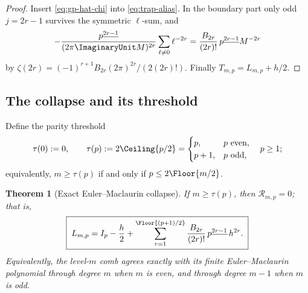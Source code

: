 \documentclass[11pt,oneside]{article}
\numberwithin{equation}{section}
\newtheorem{theorem}{Theorem}[section]
\theoremstyle{definition}
\theoremstyle{remark}
\newcommand{\fall}[2]{#1^{\underline{#2}}}
\newcommand{\defect}{\mathcal R}
\begin{document}
\begin{proof}
Insert \eqref{eq:gp-hat-chi} into \eqref{eq:trap-alias}.  In the
boundary part only odd $j=2r-1$ survives the symmetric $\ell$-sum, and
\[
 -\frac{\fall p{2r-1}}{(2\pi\ImaginaryUnit M)^{2r}}\sum_{\ell\ne0}\ell^{-2r}
 =\frac{B_{2r}}{(2r)!}\,\fall p{2r-1}M^{-2r}
\]
by $\zeta(2r)=(-1)^{r+1}B_{2r}(2\pi)^{2r}/(2(2r)!)$.  Finally
$T_{m,p}=L_{m,p}+h/2$.
\end{proof}

\subsection{The collapse and its threshold}

Define the parity threshold
\begin{equation}
 \tau(0):=0,
 \qquad
 \tau(p):=2\Ceiling{p/2}
 =\begin{cases}p,&p\text{ even},\\ p+1,&p\text{ odd},\end{cases}
 \quad p\ge1;
 \label{eq:tau}
\end{equation}
equivalently, $m\ge\tau(p)$ if and only if $p\le2\Floor{m/2}$.

\begin{theorem}[Exact Euler--Maclaurin collapse]
\label{thm:EM-collapse}
If $m\ge\tau(p)$, then $\defect_{m,p}=0$; that is,
\begin{equation}
 \boxed{\;
 L_{m,p}=I_p-\frac h2+
 \sum_{r=1}^{\Floor{(p+1)/2}}
 \frac{B_{2r}}{(2r)!}\,\fall p{2r-1}\,h^{2r}.
 \;}
 \label{eq:EM-collapse}
\end{equation}
Equivalently, the level-$m$ comb agrees exactly with its finite
Euler--Maclaurin polynomial through degree $m$ when $m$ is even, and
through degree $m-1$ when $m$ is odd.
\end{theorem}
\end{document}
